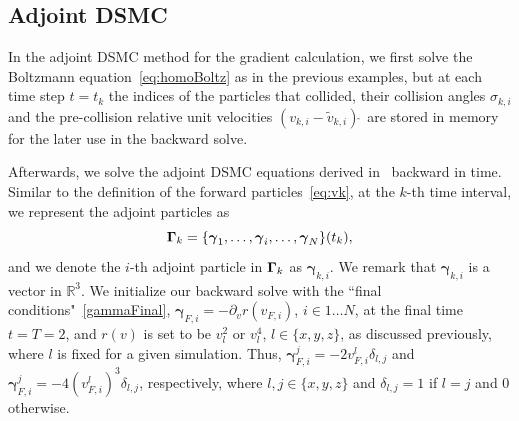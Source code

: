 \documentclass[times,final,nopreprintline]{elsarticle}
\newcommand{\bbR}{\mathbb R} \newcommand{\bbS}{\mathbb S}
\newcommand{\bgamma}{\boldsymbol \gamma}
\newcommand{\bGamma}{\mbox{\boldmath{$\Gamma$}}}
\newcommand{\Rthree}{{\bbR^3}}
\begin{document}

\subsection{Adjoint DSMC}
In the adjoint DSMC method for the gradient calculation, we first solve the Boltzmann equation~\eqref{eq:homoBoltz} as in the previous examples, but  
at each time step $t=t_k$ the indices of the particles that collided, their collision angles $\sigma_{k,i}$ and the pre-collision relative unit velocities $(v_{k,i} - {\tilde v}_{k,i}){\hat ~}$ are stored in memory for the later use in the backward solve. 

Afterwards, we solve the adjoint DSMC equations derived in~ backward in time. Similar to the definition of the forward particles~\eqref{eq:vk}, at the $k$-th time interval, we represent the adjoint particles as
\begin{equation*}
\bGamma_{k} =\{ \bgamma_{1}, \ldots, \bgamma_{i} ,\ldots, \bgamma_{N}\}(t_{k}),
\end{equation*}
and we denote the $i$-th adjoint particle in $\bGamma_k$ as $\bgamma_{k,i}$. We remark that $\bgamma_{k,i}$ is a vector in $\Rthree$. 
We initialize our backward solve with the ``final conditions"~\eqref{gammaFinal}, $\bgamma_{F,i} = - \partial_v r(v_{F,i})$, $i\in 1\dots N$, at the final time $t=T=2$, and $r(v)$ is set to be $v_l^2$ or $v_l^4$, $l\in\{x,y,z\}$, as discussed previously, where $l$ is fixed for a given simulation. Thus, $\bgamma_{F,i}^j = -  2 v_{F,i}^l \delta_{l,j}$ and $\bgamma_{F,i}^j = -  4 (v_{F,i}^l)^3 \delta_{l,j}$, respectively, where $l,j\in\{x,y,z\}$ and $\delta_{l,j}=1$ if $l=j$ and $0$ otherwise. 
\end{document}
